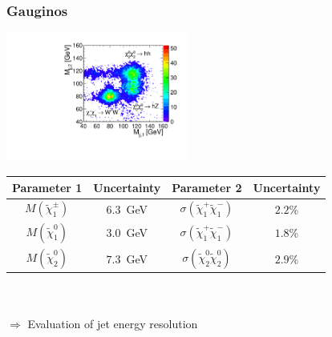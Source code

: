 \documentclass{beamer}
\begin{document}
\begin{frame}
\frametitle{Gauginos}
\centering
\includegraphics[width=6cm]{../WhizardWorkshop/MassPlot2D}\\
{\scriptsize 
\begin{tabular}{c c c c}
       \toprule
       Parameter 1                & Uncertainty &          Parameter 2 & Uncertainty \\
       \midrule
       $M(\tilde{\chi}_{1}^{\pm})$ & $6.3$~GeV & $\sigma(\tilde{\chi}_{1}^{+}\tilde{\chi}_{1}^{-})$  & $2.2$\% \\
       $M(\tilde{\chi}_{1}^{0})$   & $3.0$~GeV & $\sigma(\tilde{\chi}_{1}^{+}\tilde{\chi}_{1}^{-})$  & $1.8$\% \\
       $M(\tilde{\chi}_{2}^{0})$   & $7.3$~GeV & $\sigma(\tilde{\chi}_{2}^{0}\tilde{\chi}_{2}^{0})$  & $2.9$\% \\
\end{tabular}}\\
~\\
$\Rightarrow$ Evaluation of jet energy resolution
\end{frame}
\end{document}
